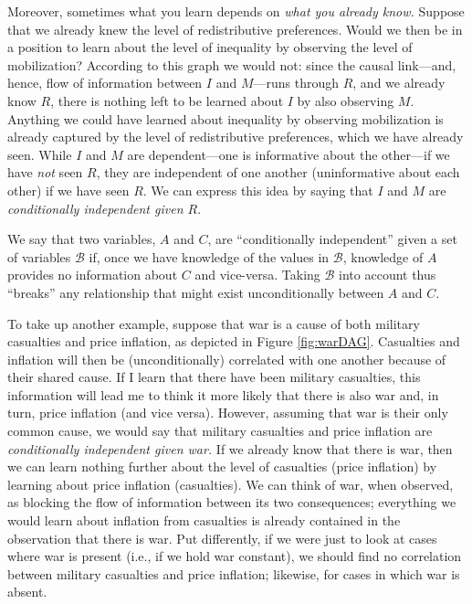 \documentclass[12pt,]{book}
\begin{document}
Moreover, sometimes what you learn depends on \emph{what you already know.} Suppose that we already knew the level of redistributive preferences. Would we then be in a position to learn about the level of inequality by observing the level of mobilization? According to this graph we would not: since the causal link---and, hence, flow of information between \(I\) and \(M\)---runs through \(R\), and we already know \(R\), there is nothing left to be learned about \(I\) by also observing \(M\). Anything we could have learned about inequality by observing mobilization is already captured by the level of redistributive preferences, which we have already seen. While \(I\) and \(M\) are dependent---one is informative about the other---if we have \emph{not} seen \(R\), they are independent of one another (uninformative about each other) if we have seen \(R\). We can express this idea by saying that \(I\) and \(M\) are \emph{conditionally independent given \(R\)}.

We say that two variables, \(A\) and \(C\), are ``conditionally independent'' given a set of variables \(\mathcal B\) if, once we have knowledge of the values in \(\mathcal B\), knowledge of \(A\) provides no information about \(C\) and vice-versa. Taking \(\mathcal B\) into account thus ``breaks'' any relationship that might exist unconditionally between \(A\) and \(C\).

To take up another example, suppose that war is a cause of both military casualties and price inflation, as depicted in Figure \ref{fig:warDAG}. Casualties and inflation will then be (unconditionally) correlated with one another because of their shared cause. If I learn that there have been military casualties, this information will lead me to think it more likely that there is also war and, in turn, price inflation (and vice versa). However, assuming that war is their only common cause, we would say that military casualties and price inflation are \emph{conditionally independent given war.} If we already know that there is war, then we can learn nothing further about the level of casualties (price inflation) by learning about price inflation (casualties). We can think of war, when observed, as blocking the flow of information between its two consequences; everything we would learn about inflation from casualties is already contained in the observation that there is war. Put differently, if we were just to look at cases where war is present (i.e., if we hold war constant), we should find no correlation between military casualties and price inflation; likewise, for cases in which war is absent.
\end{document}
